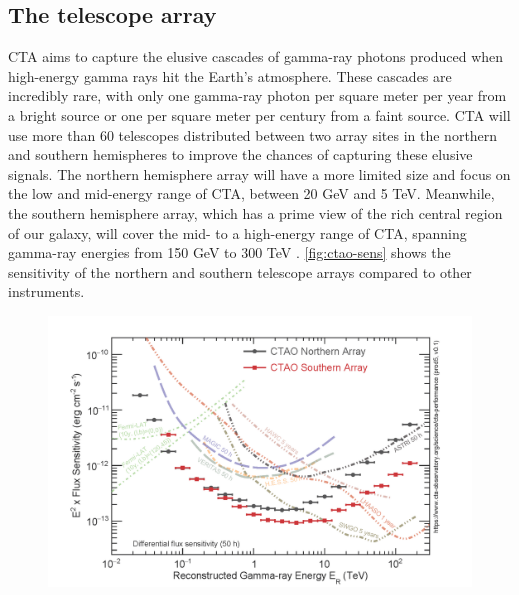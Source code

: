 \subsection{The telescope array}
\label{ss:telescope-array}
CTA aims to capture the elusive cascades of gamma-ray photons produced when high-energy gamma rays hit the Earth's atmosphere. These cascades are incredibly rare, with only one gamma-ray photon per square meter per year from a bright source or one per square meter per century from a faint source. CTA will use more than 60 telescopes distributed between two array sites in the northern and southern hemispheres to improve the chances of capturing these elusive signals. The northern hemisphere array will have a more limited size and focus on the low and mid-energy range of CTA, between 20 GeV and 5 TeV. Meanwhile, the southern hemisphere array, which has a prime view of the rich central region of our galaxy, will cover the mid- to a high-energy range of CTA, spanning gamma-ray energies from 150 GeV to 300 TeV \cite{Acharyya201935}. \autoref{fig:ctao-sens} shows the sensitivity of the northern and southern telescope arrays compared to other instruments. 
\begin{figure}[h]
\centering
\includegraphics[width=1\linewidth]{figures/introduction/ctao-sensitivity.png}
\label{fig:ctao-sens}
\end{figure}
